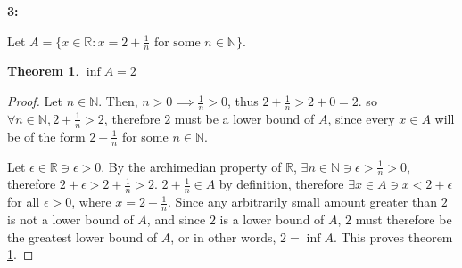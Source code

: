 \documentclass{article}
\newcommand{\reals}{\mathbb{R}}
\newcommand{\nats}{\mathbb{N}}
\newtheorem{thm}{Theorem}
\begin{document}
\textbf{3:}

Let $A = \{ x \in \reals: x = 2 + \frac{1}{n} \textrm{ for some } n \in \nats\}$.

\begin{thm} \label{thm3}
	$\inf A = 2$
\end{thm}

\begin{proof}
	Let $n \in \nats$.
	Then, $n > 0 \implies \frac{1}{n} > 0$,
	thus $2 + \frac{1}{n} > 2 + 0 = 2$.
	so $\forall n \in \nats, 2 + \frac{1}{n} > 2$,
	therefore $2$ must be a lower bound of $A$,
	since every $x \in A$ will be of the form
	$2 + \frac{1}{n}$ for some $n \in \nats$.

	Let $\epsilon \in \reals \ni \epsilon > 0$.
	By the archimedian property of $\reals$,
	$\exists n \in \nats \ni \epsilon > \frac{1}{n} > 0$,
	therefore $2 + \epsilon > 2 + \frac{1}{n} > 2$.
	$2 + \frac{1}{n} \in A$ by definition,
	therefore $\exists x \in A \ni x < 2 + \epsilon$
	for all $\epsilon > 0$,
	where $x = 2 + \frac{1}{n}$.
	Since any arbitrarily small amount greater than $2$
	is not a lower bound of $A$,
	and since $2$ is a lower bound of $A$,
	$2$ must therefore be the greatest lower bound of $A$,
	or in other words, $2 = \inf A$.
	This proves theorem \ref{thm3}.

\end{proof}
\end{document}
